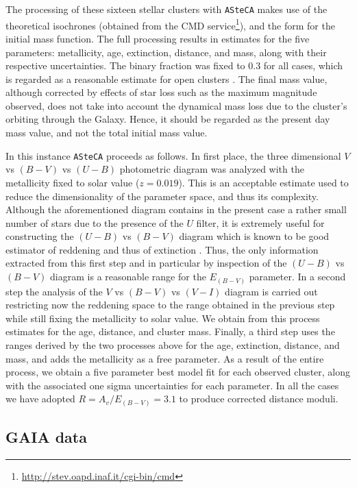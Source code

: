 \documentclass{aa}
\begin{document}
The processing of these sixteen stellar clusters with \texttt{ASteCA} makes use
of the \cite{Marigo_2008} theoretical isochrones (obtained from the CMD
service\footnote{\url{http://stev.oapd.inaf.it/cgi-bin/cmd}}), and the
\cite{Kroupa_2002} form for the initial mass function. The full processing
results in estimates for the five parameters: metallicity, age, extinction,
distance, and mass, along with their respective uncertainties. The binary
fraction was fixed to 0.3 for all cases, which is regarded as a reasonable
estimate for open clusters \citep{Sollima_2010}. The final mass value, although
corrected by effects of star loss such as the maximum magnitude observed, does
not take into account the dynamical mass loss due to the cluster's orbiting
through the Galaxy. Hence, it should be regarded as the present day mass value,
and not the total initial mass value.

In this instance \texttt{ASteCA} proceeds as follows.
In first place, the three dimensional $V$ vs $(B-V)$ vs $(U-B)$ photometric diagram
was analyzed with the metallicity fixed to solar value ($z = 0.019$). This is an
acceptable estimate used to reduce the dimensionality of the parameter space,
and thus its complexity. Although the aforementioned diagram contains in the
present case a rather small number of stars due to the presence of the $U$
filter, it is extremely useful for constructing the $(U-B)$ vs $(B-V)$ diagram which
is known to be good estimator of reddening and thus of extinction
\citep{Vazquez2008}.
Thus, the only information extracted from this first step and in
particular by inspection of the $(U-B)$ vs $(B-V)$ diagram is a reasonable range for
the $E_{(B-V)}$ parameter. In a second step the analysis of the $V$ vs $(B-V)$ vs
$(V-I)$ diagram is carried out restricting now the reddening space to the range
obtained in the previous step while still fixing the metallicity to solar value.
We obtain from this process estimates for the age, distance, and cluster mass.
Finally, a third step uses the ranges derived by the two processes above for the
age, extinction, distance, and mass, and adds the metallicity as a free
parameter. As a result of the entire process, we obtain a five parameter best
model fit for each observed cluster, along with the associated one sigma
uncertainties for each parameter. In all the cases we have adopted $R =
A_v/E_{(B-V)} = 3.1$ to produce corrected distance moduli.


\subsection{GAIA data}
\label{ssec:gaia_data}
\end{document}

